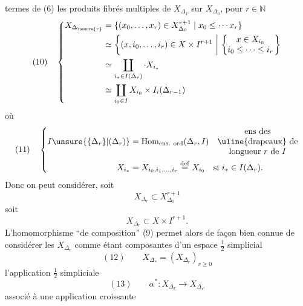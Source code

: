 termes de (6) les produits fibrés
multiples de $X_{\Delta_1}$ sur $X_{\Delta_0}$, pour $r\in\mathbb N$
\[
(10)\quad\left\{\begin{aligned}
X_{\Delta_{\unsure{r}}}&=\{(x_0,\ldots,x_r)\in X_{\Delta_0}^{r+1}\mid x_0\leq\cdots x_r\}\\
&\simeq\left\{(x,i_0,\ldots,i_r)\in X\times I^{r+1}\ \middle|\ \left\{\begin{matrix}x\in X_{i_0}\\i_0\leq\cdots\leq i_r\end{matrix}\right.\right\}\\
&\simeq\coprod_{i_*\in I(\Delta_r)}\cdot X_{i_*}\\
&\simeq\coprod_{i_0\in I}X_{i_0}\times I_i(\Delta_{r-1})
\end{aligned}\right.
\]
où
\[
(11)\quad\left\{\begin{aligned}
I\unsure{\{\Delta_r\}|(\Delta_r)}&=\operatorname{Hom}_{\text{ens. ord}}(\Delta_r,I)
\quad\begin{matrix}\text{ens des}\\\text{\uline{drapeaux} de}\\\text{longueur }r\text{ de }I\end{matrix}\\
X_{i_*}&=X_{i_0,i_1,\ldots,i_r}\overset{\mathrm{def}}{=}X_{i_0}\quad\text{si }i_*\in I(\Delta_r).
\end{aligned}\right.
\]
Donc on peut considérer, soit
\[
X_{\Delta_r}\subset X_{\Delta_0}^{r+1}
\]
soit
\[
X_{\Delta_r}\subset X\times I^{r+1}.
\]
L'homomorphisme ``de composition'' (9)
permet alors de façon bien connue de
considérer les $X_{\Delta_r}$ comme étant 
composantes d'un espace $\frac12$ simplicial
\[
(12)\qquad X_{\Delta_*}=(X_{\Delta_r})_{r\geq0}
\]
 l'application $\frac12$ simpliciale
\[
(13)\qquad\alpha^*:X_{\Delta_r}\longrightarrow X_{\Delta_{r'}}
\]
associé à une application croissante
